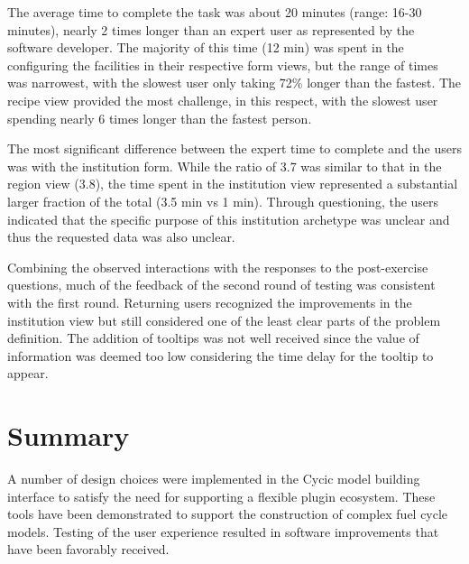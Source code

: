 The average time to complete the task was about 20 minutes (range: 16-30
minutes), nearly 2 times longer than an expert user as represented by the
software developer.  The majority of this time (12 min) was spent in the
configuring the facilities in their respective form views, but the range of
times was narrowest, with the slowest user only taking 72\% longer than the
fastest.  The recipe view provided the most challenge, in this respect, with
the slowest user spending nearly 6 times longer than the fastest person.

The most significant difference between the expert time to complete and the
users was with the institution form.  While the ratio of 3.7 was similar to
that in the region view (3.8), the time spent in the institution view
represented a substantial larger fraction of the total (3.5 min vs 1 min).
Through questioning, the users indicated that the specific purpose of this
institution archetype was unclear and thus the requested data was also
unclear.

Combining the observed interactions with the responses to the post-exercise
questions, much of the feedback of the second round of testing was consistent
with the first round.  Returning users recognized the improvements in the
institution view but still considered one of the least clear parts of the
problem definition.  The addition of tooltips was not well received since the
value of information was deemed too low considering the time delay for the
tooltip to appear.

\section{Summary}

A number of design choices were implemented in the Cycic model building
interface to satisfy the need for supporting a flexible plugin ecosystem.
These tools have been demonstrated to support the construction of complex fuel
cycle models.  Testing of the user experience resulted in software
improvements that have been favorably received.
